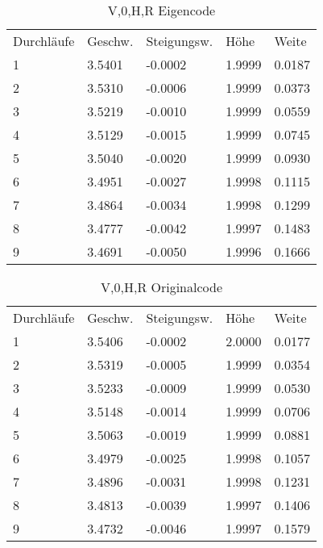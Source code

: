 \documentclass{article}
\begin{document}
\begin{table}
\centering
\caption{V,0,H,R Eigencode}
\begin{tabular}{lllll}
Durchläufe & Geschw. & Steigungsw. & Höhe   & Weite   \\
1          & 3.5401  & -0.0002     & 1.9999 & 0.0187  \\
2          & 3.5310  & -0.0006     & 1.9999 & 0.0373  \\
3          & 3.5219  & -0.0010     & 1.9999 & 0.0559  \\
4          & 3.5129  & -0.0015     & 1.9999 & 0.0745  \\
5          & 3.5040  & -0.0020     & 1.9999 & 0.0930  \\
6          & 3.4951  & -0.0027     & 1.9998 & 0.1115  \\
7          & 3.4864  & -0.0034     & 1.9998 & 0.1299  \\
8          & 3.4777  & -0.0042     & 1.9997 & 0.1483  \\
9          & 3.4691  & -0.0050     & 1.9996 & 0.1666 
\end{tabular}
\end{table}
\begin{table}
\centering
\caption{V,0,H,R Originalcode}
\begin{tabular}{lllll}
Durchläufe & Geschw. & Steigungsw. & Höhe   & Weite   \\
1          & 3.5406  & -0.0002     & 2.0000 & 0.0177  \\
2          & 3.5319  & -0.0005     & 1.9999 & 0.0354  \\
3          & 3.5233  & -0.0009     & 1.9999 & 0.0530  \\
4          & 3.5148  & -0.0014     & 1.9999 & 0.0706  \\
5          & 3.5063  & -0.0019     & 1.9999 & 0.0881  \\
6          & 3.4979  & -0.0025     & 1.9998 & 0.1057  \\
7          & 3.4896  & -0.0031     & 1.9998 & 0.1231  \\
8          & 3.4813  & -0.0039     & 1.9997 & 0.1406  \\
9          & 3.4732  & -0.0046     & 1.9997 & 0.1579 
\end{tabular}
\end{table}
\end{document}
